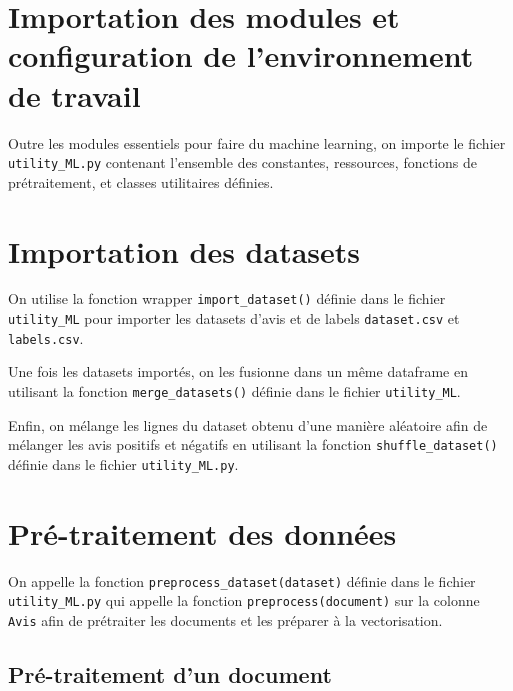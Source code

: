 \documentclass[11pt]{article}
\begin{document}


\hypertarget{importation-des-modules-et-configuration-de-lenvironnement-de-travail}{%
\section{Importation des modules et configuration de
l'environnement de
travail}\label{importation-des-modules-et-configuration-de-lenvironnement-de-travail}}
Outre les modules essentiels pour faire du machine learning, on importe
le fichier \texttt{utility\_ML.py} contenant l'ensemble des constantes,
ressources, fonctions de prétraitement, et classes utilitaires définies.



\hypertarget{importation-des-datasets}{%
\section{Importation des
datasets}\label{importation-des-datasets}}
On utilise la fonction wrapper \texttt{import\_dataset()} définie dans
le fichier \texttt{utility\_ML} pour importer les datasets d'avis et de
labels \texttt{dataset.csv} et \texttt{labels.csv}.

Une fois les datasets importés, on les fusionne dans un même dataframe
en utilisant la fonction \texttt{merge\_datasets()} définie dans le
fichier \texttt{utility\_ML}.

Enfin, on mélange les lignes du dataset obtenu d'une manière aléatoire
afin de mélanger les avis positifs et négatifs en utilisant la fonction
\texttt{shuffle\_dataset()} définie dans le fichier
\texttt{utility\_ML.py}.



\hypertarget{pruxe9-traitement-des-donnuxe9es}{%
\section{Pré-traitement des
données}\label{pruxe9-traitement-des-donnuxe9es}}
On appelle la fonction \texttt{preprocess\_dataset(dataset)} définie
dans le fichier \texttt{utility\_ML.py} qui appelle la fonction
\texttt{preprocess(document)} sur la colonne \texttt{Avis} afin de
prétraiter les documents et les préparer à la vectorisation.

\hypertarget{pruxe9-traitement-dun-document}{%
\subsection{Pré-traitement d'un
document}\label{pruxe9-traitement-dun-document}}
\end{document}
